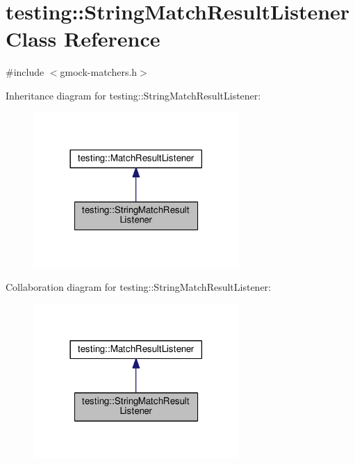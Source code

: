 \hypertarget{classtesting_1_1StringMatchResultListener}{}\section{testing\+:\+:String\+Match\+Result\+Listener Class Reference}
\label{classtesting_1_1StringMatchResultListener}


{\ttfamily \#include $<$gmock-\/matchers.\+h$>$}



Inheritance diagram for testing\+:\+:String\+Match\+Result\+Listener\+:\nopagebreak
\begin{figure}[H]
\begin{center}
\leavevmode
\includegraphics[width=222pt]{classtesting_1_1StringMatchResultListener__inherit__graph}
\end{center}
\end{figure}


Collaboration diagram for testing\+:\+:String\+Match\+Result\+Listener\+:\nopagebreak
\begin{figure}[H]
\begin{center}
\leavevmode
\includegraphics[width=222pt]{classtesting_1_1StringMatchResultListener__coll__graph}
\end{center}
\end{figure}

